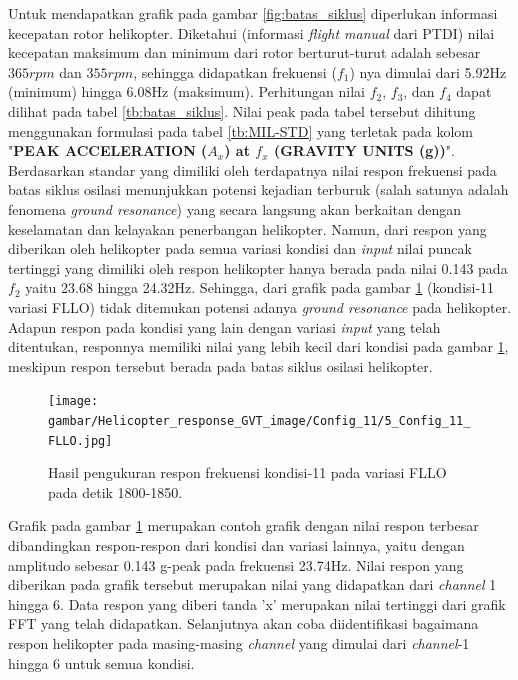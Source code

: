 Untuk mendapatkan grafik pada gambar \ref{fig:batas_siklus} diperlukan informasi kecepatan rotor helikopter. Diketahui (informasi \textit{flight manual} dari PTDI) nilai kecepatan maksimum dan minimum dari rotor berturut-turut adalah sebesar $365 rpm$ dan $355 rpm$, sehingga didapatkan frekuensi ($f_1$) nya dimulai dari 5.92Hz (minimum) hingga 6.08Hz (maksimum). Perhitungan nilai $f_2$, $f_3$, dan $f_4$ dapat dilihat pada tabel \ref{tb:batas_siklus}. Nilai peak pada tabel tersebut dihitung menggunakan formulasi pada tabel \ref{tb:MIL-STD} yang terletak pada kolom "\textbf{PEAK ACCELERATION ($A_x$) at $f_x$ (GRAVITY UNITS (g))}". Berdasarkan standar yang dimiliki oleh \cite{MILSTD} terdapatnya nilai respon frekuensi pada batas siklus osilasi menunjukkan potensi kejadian terburuk (salah satunya adalah fenomena \textit{ground resonance}) yang secara langsung akan berkaitan dengan keselamatan dan kelayakan penerbangan helikopter. Namun, dari respon yang diberikan oleh helikopter pada semua variasi kondisi dan \textit{input} nilai puncak tertinggi yang dimiliki oleh respon helikopter hanya berada pada nilai 0.143 pada $f_2$ yaitu 23.68 hingga 24.32Hz. Sehingga, dari grafik pada gambar \ref{fig:11_FLLO} (kondisi-11 variasi FLLO) tidak ditemukan potensi adanya \textit{ground resonance} pada helikopter. Adapun respon pada kondisi yang lain dengan variasi \textit{input} yang telah ditentukan, responnya memiliki nilai yang lebih kecil dari kondisi pada gambar \ref{fig:11_FLLO}, meskipun respon tersebut berada pada batas siklus osilasi helikopter.

\begin{figure}[h]
	\centering
	\texttt{[image: gambar/Helicopter\_response\_GVT\_image/Config\_11/5\_Config\_11\_FLLO.jpg]}
	\caption{Hasil pengukuran respon frekuensi kondisi-11 pada variasi FLLO pada detik 1800-1850.}
	\label{fig:11_FLLO}
\end{figure}

Grafik pada gambar \ref{fig:11_FLLO} merupakan contoh grafik dengan nilai respon terbesar dibandingkan respon-respon dari kondisi dan variasi lainnya, yaitu dengan amplitudo sebesar 0.143 g-peak pada frekuensi 23.74Hz. Nilai respon yang diberikan pada grafik tersebut merupakan nilai yang didapatkan dari \textit{channel} 1 hingga 6. Data respon yang diberi tanda 'x' merupakan nilai tertinggi dari grafik FFT yang telah didapatkan. Selanjutnya akan coba diidentifikasi bagaimana respon helikopter pada masing-masing \textit{channel} yang dimulai dari \textit{channel}-1 hingga 6 untuk semua kondisi.

